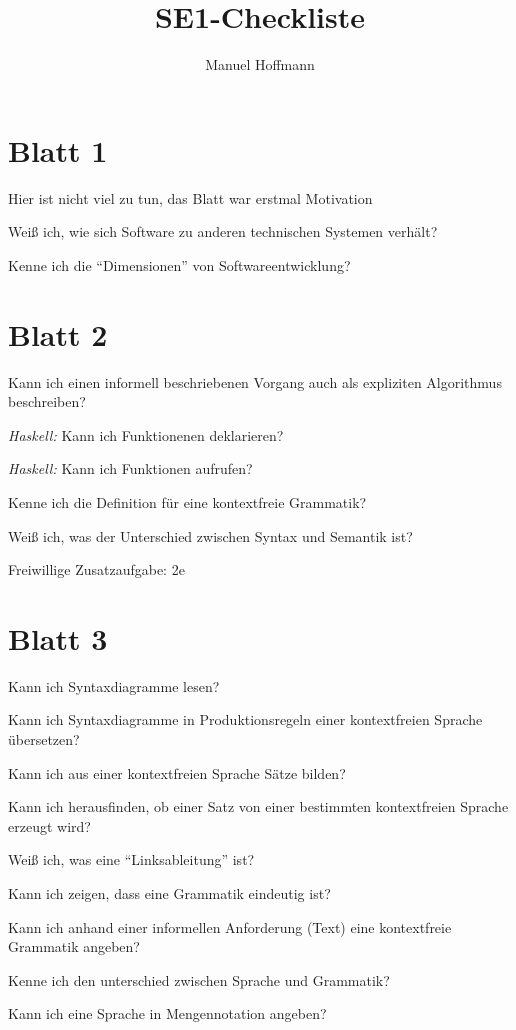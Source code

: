 \documentclass{article}
\author{Manuel Hoffmann}
\title{SE1-Checkliste}
\newcommand*{\thecheckbox}{\hss[\hss]}
\newenvironment*{checklist} 
{\list{}{\itemsep -2pt 
\renewcommand*{\makelabel}[1]{\thecheckbox}}} 
{\endlist}
\begin{document}
\section{Blatt 1}
Hier ist nicht viel zu tun, das Blatt war erstmal Motivation
\begin{checklist}
  \item Weiß ich, wie sich Software zu anderen technischen Systemen verhält? 
  \item Kenne ich die "`Dimensionen"' von Softwareentwicklung?
\end{checklist}

\section{Blatt 2}

\begin{checklist}
  \item Kann ich einen informell beschriebenen Vorgang auch als expliziten Algorithmus beschreiben?
  \item \emph{Haskell:} Kann ich Funktionenen deklarieren?
  \item \emph{Haskell:} Kann ich Funktionen aufrufen?
  \item Kenne ich die Definition für eine kontextfreie Grammatik?
  \item Weiß ich, was der Unterschied zwischen Syntax und Semantik ist?
\end{checklist}

Freiwillige Zusatzaufgabe: 2e

\section{Blatt 3}

\begin{checklist}
  \item Kann ich Syntaxdiagramme lesen?
  \item Kann ich Syntaxdiagramme in Produktionsregeln einer kontextfreien Sprache übersetzen?
  \item Kann ich aus einer kontextfreien Sprache Sätze bilden?
  \item Kann ich herausfinden, ob einer Satz von einer bestimmten kontextfreien Sprache erzeugt wird?
  \item Weiß ich, was eine "`Linksableitung"' ist?
  \item Kann ich zeigen, dass eine Grammatik eindeutig ist?
  \item Kann ich anhand einer informellen Anforderung (Text) eine kontextfreie Grammatik angeben?
  \item Kenne ich den unterschied zwischen Sprache und Grammatik?
  \item Kann ich eine Sprache in Mengennotation angeben?
\end{checklist}
\end{document}
